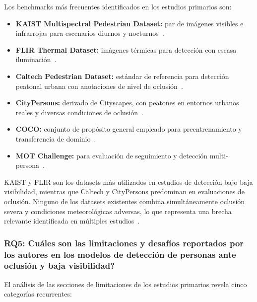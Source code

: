 \documentclass[12pt, a4paper]{article}
\begin{document}
Los benchmarks m\'{a}s frecuentes identificados en los estudios
primarios son:
\begin{itemize}
  \item \textbf{KAIST Multispectral Pedestrian Dataset:} par de
        im\'{a}genes visibles e infrarrojas para escenarios diurnos y
        nocturnos~\cite{E35, E31, E17, E26}.
  \item \textbf{FLIR Thermal Dataset:} im\'{a}genes t\'{e}rmicas para
        detecci\'{o}n con escasa iluminaci\'{o}n~\cite{E34, E14, E16}.
  \item \textbf{Caltech Pedestrian Dataset:} est\'{a}ndar de referencia
        para detecci\'{o}n peatonal urbana con anotaciones de nivel de
        oclusi\'{o}n~\cite{E29, E28, E11}.
  \item \textbf{CityPersons:} derivado de Cityscapes, con peatones en
        entornos urbanos reales y diversas condiciones de
        oclusi\'{o}n~\cite{E22, E25}.
  \item \textbf{COCO:} conjunto de prop\'{o}sito general empleado para
        preentrenamiento y transferencia de dominio~\cite{E20, E32}.
  \item \textbf{MOT Challenge:} para evaluaci\'{o}n de seguimiento y
        detecci\'{o}n multi-persona~\cite{E24}.
\end{itemize}

\begin{hallazgo}[]
  KAIST y FLIR son los datasets m\'{a}s utilizados en estudios de
  detecci\'{o}n bajo baja visibilidad, mientras que Caltech y
  CityPersons predominan en evaluaciones de oclusi\'{o}n. Ninguno de
  los datasets existentes combina simult\'{a}neamente oclusi\'{o}n
  severa y condiciones meteorol\'{o}gicas adversas, lo que representa
  una brecha relevante identificada en m\'{u}ltiples
  estudios~\cite{E31, E17, E07}.
\end{hallazgo}

\subsubsection{RQ5: \textquestiondown Cu\'{a}les son las limitaciones y
desaf\'{i}os reportados por los autores en los modelos de
detecci\'{o}n de personas ante oclusi\'{o}n y baja visibilidad?}

El an\'{a}lisis de las secciones de limitaciones de los estudios
primarios revela cinco categor\'{i}as recurrentes:
\end{document}
